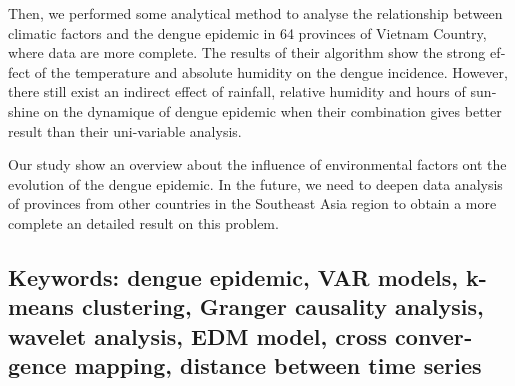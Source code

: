 \begin{otherlanguage}{english}
Then, we performed some analytical method to analyse the relationship between climatic factors and the dengue epidemic in 64 provinces of Vietnam Country, where data are more complete. The results of their algorithm show the strong effect of the temperature and absolute humidity on the dengue incidence. However, there still exist an indirect effect of rainfall, relative humidity and hours of sunshine on the dynamique of dengue epidemic when their combination gives better result than their uni-variable analysis.

Our study show an overview about the influence of environmental factors ont the evolution of the dengue epidemic. In the future, we need to deepen data analysis of provinces from other countries in the Southeast Asia region to obtain a more complete an detailed result on this problem. 

\subsection*{Keywords: dengue epidemic, VAR models, k-means clustering, Granger causality analysis, wavelet analysis, EDM model, cross convergence mapping, distance between time series}

\end{otherlanguage}   
